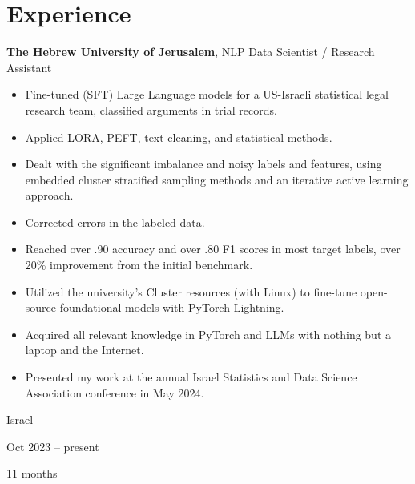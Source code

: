 \documentclass[10pt, letterpaper]{article}
\newenvironment{highlights}{
    \begin{itemize}[
        topsep=0.10 cm,
        parsep=0.10 cm,
        partopsep=0pt,
        itemsep=0pt,
        leftmargin=0.4 cm + 10pt
    ]
}{
    \end{itemize}
} %
\newenvironment{twocolentry}[2][]{
    \onecolentry
    \def\secondColumn{#2}
    \setcolumnwidth{\fill, 4.5 cm}
    \begin{paracol}{2}
}{
    \switchcolumn \raggedleft \secondColumn
    \end{paracol}
    \endonecolentry
} %
\begin{document}
    
    \section{Experience}



        
        \begin{twocolentry}{
            Israel

        Oct 2023 – present

        11 months
        }
            \textbf{The Hebrew University of Jerusalem}, NLP Data Scientist / Research Assistant
            \begin{highlights}
                \item Fine-tuned (SFT) Large Language models for a US-Israeli statistical legal research team, classified arguments in trial records.
                \item Applied LORA, PEFT, text cleaning, and statistical methods.
                \item Dealt with the significant imbalance and noisy labels and features, using embedded cluster stratified sampling methods and an iterative active learning approach.
                \item Corrected errors in the labeled data.
                \item Reached over .90 accuracy and over .80 F1 scores in most target labels, over 20\% improvement from the initial benchmark.
                \item Utilized the university's Cluster resources (with Linux) to fine-tune open-source foundational models with PyTorch Lightning.
                \item Acquired all relevant knowledge in PyTorch and LLMs with nothing but a laptop and the Internet.
                \item Presented my work at the annual Israel Statistics and Data Science Association conference in May 2024.
            \end{highlights}
        \end{twocolentry}


        \vspace{0.2 cm}
\end{document}
